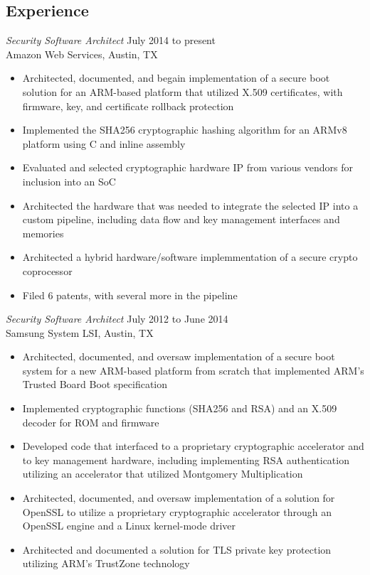 \documentclass[overlapped]{res}
\begin{document}
\begin{resume}
\section{Experience}
{\sl Security Software Architect} \hfill July 2014 to present \\
	Amazon Web Services, Austin, TX
\begin{itemize}
	\item Architected, documented, and begain implementation of a secure boot solution for an ARM-based platform that utilized X.509 certificates, with firmware, key, and certificate rollback protection
	\item Implemented the SHA256 cryptographic hashing algorithm for an ARMv8 platform using C and inline assembly
	\item Evaluated and selected cryptographic hardware IP from various vendors for inclusion into an SoC
	\item Architected the hardware that was needed to integrate the selected IP into a custom pipeline, including data flow and key management interfaces and memories
	\item Architected a hybrid hardware/software implemmentation of a secure crypto coprocessor
	\item Filed 6 patents, with several more in the pipeline
\end{itemize}
{\sl Security Software Architect} \hfill July 2012 to June 2014 \\
	Samsung System LSI, Austin, TX
\begin{itemize}
	\item Architected, documented, and oversaw implementation of a secure boot system for a new ARM-based platform from scratch that implemented ARM's Trusted Board Boot specification
	\item Implemented cryptographic functions (SHA256 and RSA) and an X.509 decoder for ROM and firmware
	\item Developed code that interfaced to a proprietary cryptographic accelerator and to key management hardware, including implementing RSA authentication utilizing an accelerator that utilized Montgomery Multiplication
	\item Architected, documented, and oversaw implementation of a solution for OpenSSL to utilize a proprietary cryptographic accelerator through an OpenSSL engine and a Linux kernel-mode driver
	\item Architected and documented a solution for TLS private key protection utilizing ARM's TrustZone technology

\end{itemize}
\end{resume}
\end{document}
